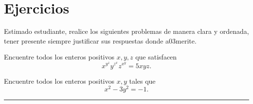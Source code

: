 \section*{Ejercicios}

Estimado estudiante, realice los siguientes problemas de manera clara y ordenada, tener presente siempre justificar sus respuestas donde a03merite.

\begin{problem}
    Encuentre todos los enteros positivos $x,y,z$ que satisfacen
    \[
        x^{y^{z}} y^{z^{x}} z^{x^{y}} = 5xyz.
    \]
\end{problem}

\begin{problem}
    Encuentre todos los enteros positivos $x,y$ tales que
    \[
        x^2 - 3y^2 = -1.
    \]
\end{problem}
\hrule



